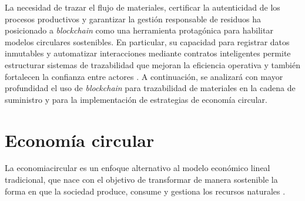 La necesidad de trazar el flujo de materiales, certificar la autenticidad de los procesos productivos y garantizar la gestión responsable de residuos ha posicionado a \textit{blockchain} como una herramienta protagónica para habilitar modelos circulares sostenibles. En particular, su capacidad para registrar datos inmutables y automatizar interacciones mediante contratos inteligentes permite estructurar sistemas de trazabilidad que mejoran la eficiencia operativa y también fortalecen la confianza entre actores \cite{sharabati2024blockchain, rejeb2023role}. A continuación, se analizará con mayor profundidad el uso de \textit{blockchain} para trazabilidad de materiales en la cadena de suministro y para la implementación de estrategias de economía circular.

\section{Economía circular}
\label{sec:circular-economy}

La \gls{economiacircular} es un enfoque alternativo al modelo económico lineal tradicional, que nace con el objetivo de transformar de manera sostenible la forma en que la sociedad produce, consume y gestiona los recursos naturales \cite{espanacircular2030}.

